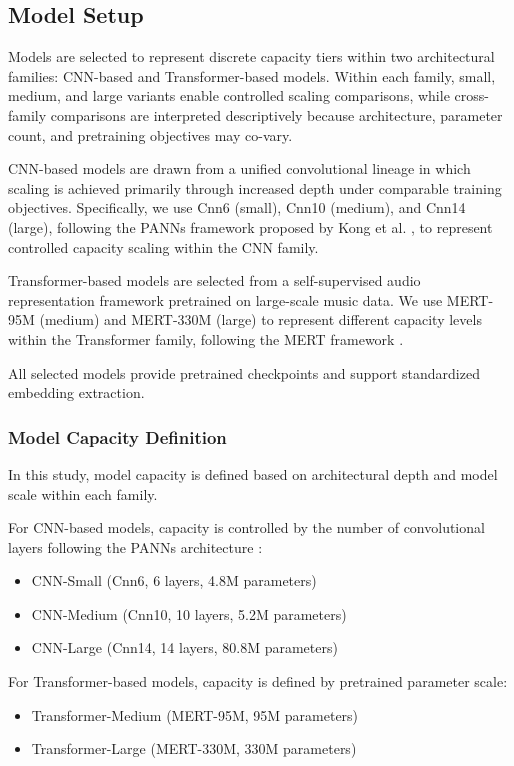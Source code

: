 \documentclass{article}
\begin{document}
\subsection{Model Setup}

Models are selected to represent discrete capacity tiers within two architectural families: CNN-based and Transformer-based models. Within each family, small, medium, and large variants enable controlled scaling comparisons, while cross-family comparisons are interpreted descriptively because architecture, parameter count, and pretraining objectives may co-vary.

CNN-based models are drawn from a unified convolutional lineage in which scaling is achieved
primarily through increased depth under comparable training objectives. Specifically, we use Cnn6
(small), Cnn10 (medium), and Cnn14 (large), following the PANNs framework proposed by Kong et al.
\cite{kong2020panns}, to represent controlled capacity scaling within the CNN family.

Transformer-based models are selected from a self-supervised audio representation framework
pretrained on large-scale music data. We use MERT-95M (medium) and MERT-330M (large)
to represent different capacity levels within the Transformer family, following the MERT framework
\cite{li2023mert}.

All selected models provide pretrained checkpoints and support standardized embedding extraction.

\subsubsection{Model Capacity Definition}

In this study, model capacity is defined based on architectural depth and model scale within each family.

For CNN-based models, capacity is controlled by the number of convolutional layers following the PANNs architecture \cite{kong2020panns}:
\begin{itemize}
  \item CNN-Small (Cnn6, 6 layers, 4.8M parameters)
  \item CNN-Medium (Cnn10, 10 layers, 5.2M parameters)
  \item CNN-Large (Cnn14, 14 layers, 80.8M parameters)
\end{itemize}

For Transformer-based models, capacity is defined by pretrained parameter scale:
\begin{itemize}
  \item Transformer-Medium (MERT-95M, 95M parameters)
  \item Transformer-Large (MERT-330M, 330M parameters)
\end{itemize}
\end{document}

